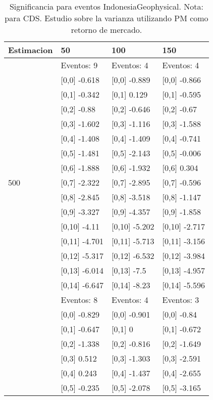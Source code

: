 \begin{table}

\caption{Significancia para eventos IndonesiaGeophysical. Nota: para CDS. Estudio sobre la varianza utilizando PM como retorno de mercado.}
\centering
\begin{tabular}[t]{llll}
\toprule
Estimacion & 50 & 100 & 150\\
\midrule
 & Eventos:  9 & Eventos:  4 & Eventos:  4\\
 & {}[0,0] -0.618 & {}[0,0] -0.889 & {}[0,0] -0.866\\
 & {}[0,1] -0.342 & {}[0,1] 0.129 & {}[0,1] -0.595\\
 & {}[0,2] -0.88 & {}[0,2] -0.646 & {}[0,2] -0.67\\
 & {}[0,3] -1.602 & {}[0,3] -1.116 & {}[0,3] -1.588\\
\addlinespace
 & {}[0,4] -1.408 & {}[0,4] -1.409 & {}[0,4] -0.741\\
 & {}[0,5] -1.481 & {}[0,5] -2.143 & {}[0,5] -0.006\\
 & {}[0,6] -1.888 & {}[0,6] -1.932 & {}[0,6] 0.304\\
500 & {}[0,7] -2.322 & {}[0,7] -2.895 & {}[0,7] -0.596\\
 & {}[0,8] -2.845 & {}[0,8] -3.518 & {}[0,8] -1.147\\
\addlinespace
 & {}[0,9] -3.327 & {}[0,9] -4.357 & {}[0,9] -1.858\\
 & {}[0,10] -4.11 & {}[0,10] -5.202 & {}[0,10] -2.717\\
 & {}[0,11] -4.701 & {}[0,11] -5.713 & {}[0,11] -3.156\\
 & {}[0,12] -5.317 & {}[0,12] -6.532 & {}[0,12] -3.984\\
 & {}[0,13] -6.014 & {}[0,13] -7.5 & {}[0,13] -4.957\\
\addlinespace
 & {}[0,14] -6.647 & {}[0,14] -8.23 & {}[0,14] -5.596\\
 & Eventos:  8 & Eventos:  4 & Eventos:  3\\
 & {}[0,0] -0.829 & {}[0,0] -0.901 & {}[0,0] -0.84\\
 & {}[0,1] -0.647 & {}[0,1] 0 & {}[0,1] -0.672\\
 & {}[0,2] -1.338 & {}[0,2] -0.816 & {}[0,2] -1.649\\
\addlinespace
 & {}[0,3] 0.512 & {}[0,3] -1.303 & {}[0,3] -2.591\\
 & {}[0,4] 0.243 & {}[0,4] -1.437 & {}[0,4] -2.655\\
 & {}[0,5] -0.235 & {}[0,5] -2.078 & {}[0,5] -3.165\\

\end{tabular}
\end{table}
